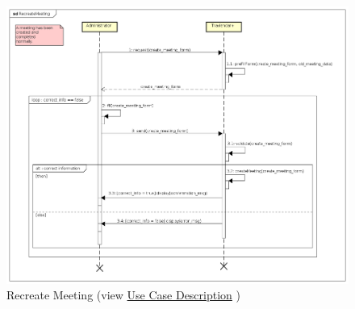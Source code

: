 \begin{figure}[H]
	\centering\includegraphics[width=\textwidth]{Images/SequenceDiagrams/Admin/RecreateMeeting.png}{}
	\caption[Recreate Meeting]{{Recreate Meeting}\label{SeqDiagr:RecreateMeeting} (view \hyperref[UseCaseDescr:RecreateMeeting]{Use Case Description} )}
\end{figure}


